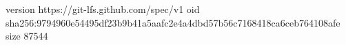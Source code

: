 version https://git-lfs.github.com/spec/v1
oid sha256:9794960e54495df23b9b41a5aafc2e4a4dbd57b56c7168418ca6ceb764108afe
size 87544
